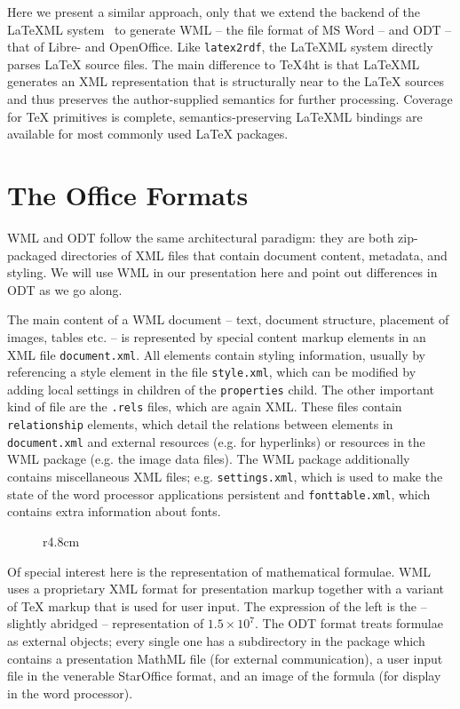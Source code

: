 \documentclass{llncs}
\def\latexml{{\LaTeX}ML\xspace}
\begin{document}
Here we present a similar approach, only that we extend the backend of the \latexml
system~\cite{Miller:latexml:online} to generate WML -- the file format of MS Word -- and
ODT -- that of Libre- and OpenOffice. Like \texttt{latex2rdf}, the \latexml system
directly parses {\LaTeX} source files. The main difference to TeX4ht is that \latexml
generates an XML representation that is structurally near to the {\LaTeX} sources and thus
preserves the author-supplied semantics for further processing. Coverage for {\TeX}
primitives is complete, semantics-preserving \latexml bindings are available for most
commonly used {\LaTeX} packages.

\section{The Office Formats}\label{sec:target}

WML and ODT follow the same architectural paradigm: they are both zip-packaged directories
of XML files that contain document content, metadata, and styling. We will use WML in our
presentation here and point out differences in ODT as we go along.

The main content of a WML document -- text, document structure, placement of images,
tables etc. -- is represented by special content markup elements in an XML file
\texttt{document.xml}. All elements contain styling information, usually by referencing a
style element in the file \texttt{style.xml}, which can be modified by adding local
settings in children of the \texttt{properties} child. The other important kind of file
are the \texttt{.rels} files, which are again XML. These files contain
\texttt{relationship} elements, which detail the relations between elements in
\texttt{document.xml} and external resources (e.g. for hyperlinks) or resources in the WML
package (e.g. the image data files). The WML package additionally contains miscellaneous
XML files; e.g. \texttt{settings.xml}, which is used to make the state of the word
processor applications persistent and \texttt{fonttable.xml}, which contains extra
information about fonts.

\begin{figure}r{4.8cm}\vspace*{-3em}

\vspace*{-3em}
\end{figure}
Of special interest here is the representation of mathematical formulae. WML uses a
proprietary XML format for presentation markup together with a variant of {\TeX} markup
that is used for user input. The expression of the left is the --slightly abridged --
representation of $1.5\times 10^7$.  The ODT format treats formulae as external objects;
every single one has a subdirectory in the package which contains a presentation MathML
file (for external communication), a user input file in the venerable StarOffice format,
and an image of the formula (for display in the word processor).
\end{document}
